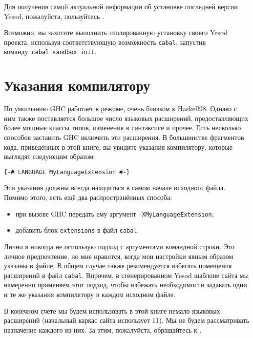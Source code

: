 Для получения самой актуальной информации об установке последней версии Yesod,
пожалуйста, пользуйтесь
.

\begin{remark}
    Возможно, вы захотите выполнить изолированную установку своего Yesod
    проекта, используя соответствующую возможность \texttt{cabal}, запустив
    команду~\texttt{cabal~sandbox~init}.
\end{remark}

\section{Указания компилятору}

По умолчанию GHC работает в режиме, очень близком к Haskell98. Однако с ним
также поставляется большое число языковых расширений, предоставляющих более
мощные классы типов, изменения в синтаксисе и прочее. Есть несколько способов
заставить GHC включить эти расширения. В большинстве фрагментов кода,
приведённых в этой книге, вы увидите указания компилятору, которые выглядят
следующим образом:

\begin{lstlisting}
{-# LANGUAGE MyLanguageExtension #-}
\end{lstlisting}

Эти указания должны всегда находиться в самом начале исходного файла. Помимо
этого, есть ещё два распространённых способа:
\begin{itemize}
\item при вызове GHC передать ему аргумент \lstinline'-XMyLanguageExtension';
\item добавить блок \texttt{extensions} в файл \texttt{cabal}.
\end{itemize}

Лично я никогда не использую подход с аргументами командной строки. Это личное
предпочтение, но мне нравится, когда мои настройки явным образом указаны в
файле. В общем случае также рекомендуется избегать помещения расширений в файл
\texttt{cabal}. Впрочем, в сгенерированном Yesod шаблоне сайта мы намеренно
применяем этот подход, чтобы избежать необходимости задавать одни и те же
указания компилятору в каждом исходном файле.

В конечном счёте мы будем использовать в этой книге немало языковых расширений
(начальный каркас сайта использует 11). Мы не будем рассматривать назначение
каждого из них. За этим, пожалуйста, обращайтесь к
.

